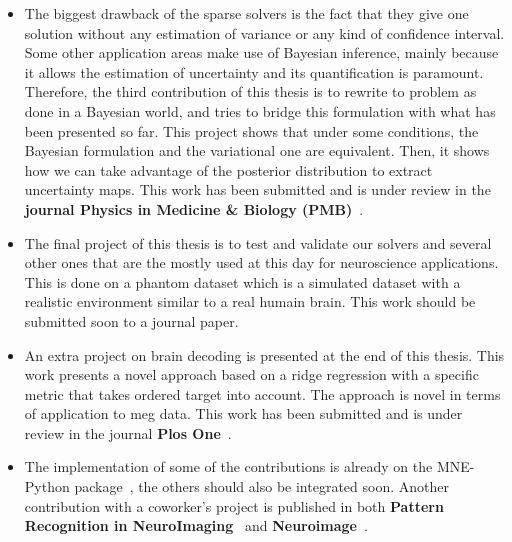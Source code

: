 \begin{itemize}
\item The biggest drawback of the sparse solvers is the fact that they give one solution without any estimation of variance or any kind of confidence interval. Some other application areas make use of Bayesian inference, mainly because it allows the estimation of uncertainty and its quantification is paramount. Therefore, the third contribution of this thesis is to rewrite to problem as done in a Bayesian world, and tries to bridge this formulation with what has been presented so far. This project shows that under some conditions, the Bayesian formulation and the variational one are equivalent. Then, it shows how we can take advantage of the posterior distribution to extract uncertainty maps. This work has been submitted and is under review in the \textbf{journal Physics in Medicine \& Biology (PMB)}~\cite{bekhti_arxiv_pmb}.

\item The final project of this thesis is to test and validate our solvers and several other ones that are the mostly used at this day for neuroscience applications. This is done on a phantom dataset which is a simulated dataset with a realistic environment similar to a real humain brain. This work should be submitted soon to a journal paper.

\item An extra project on brain decoding is presented at the end of this thesis. This work presents a novel approach based on a ridge regression with a specific metric that takes ordered target into account. The approach is novel in terms of application to \ac{meg} data. This work has been submitted and is under review in the journal \textbf{Plos One}~\cite{Bekhti_bioarxiv}.

\item The implementation of some of the contributions is already on the MNE-Python package~\cite{mne,mne-python}, the others should also be integrated soon. Another contribution with a coworker's project is published in both \textbf{Pattern Recognition in NeuroImaging}~\cite{jas_autoreject_prni} and \textbf{Neuroimage}~\cite{jas_neuroimage}.
\end{itemize}

